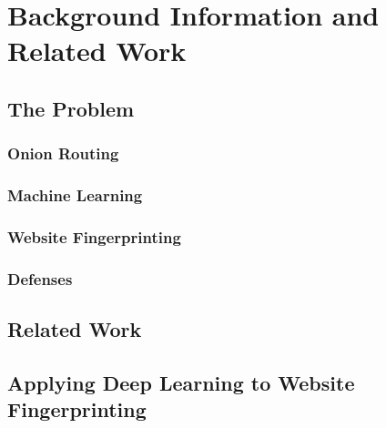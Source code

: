 \section{Background Information and Related Work}

\subsection{The Problem}
\subsubsection{Onion Routing}

\subsubsection{Machine Learning}

\subsubsection{Website Fingerprinting}

\subsubsection{Defenses}

\subsection{Related Work}

\subsection{Applying Deep Learning to Website Fingerprinting}
